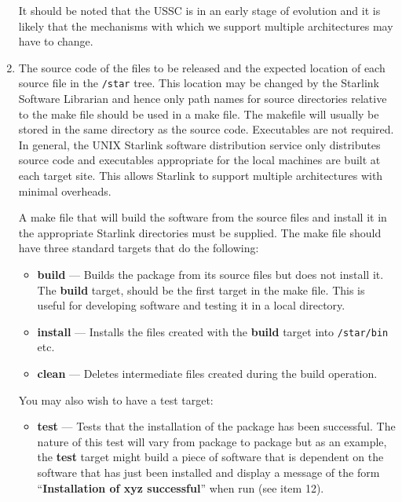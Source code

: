 \begin{enumerate}
It should be noted that the USSC is in an early stage of evolution and it
is likely that the mechanisms with which we support multiple architectures
may have to change.

\item The source code of the files to be released and the expected location
of each source file in the {\tt /star} tree. This location may be changed by
the  Starlink  Software Librarian and hence only path names for source
directories relative to the make file should be used in a make file. The
makefile will usually  be stored in the same directory as the source code.
Executables are not required. In general, the UNIX Starlink software
distribution  service only distributes source code and executables appropriate
for the local machines are built at each target site. This allows Starlink to
support multiple architectures with minimal overheads.

A make file that will build the software from the source files and
install it in the appropriate Starlink directories must be supplied.
The make file should have three standard targets that do the following:

\begin{itemize}

\item {\bf build} --- Builds the package from its source files but does not
install it. The {\bf build} target, should be the first target
in the make file. This is useful for developing software and testing it
in a local directory.

\item {\bf install} --- Installs the files created with the {\bf build}
target into {\tt /star/bin} etc.

\item {\bf clean} --- Deletes intermediate files created during the build
operation.

\end{itemize}

You may also wish to have a test target:

\begin{itemize}


\item {\bf test} --- Tests that the installation of the package has been
successful. The nature of this test will vary from package to package but as
an example, the {\bf test} target might build a piece of software that is
dependent on the software that has just been installed and display a
message of the form ``{\bf Installation of xyz successful}'' when run
(see item 12).


\end{itemize}
\end{enumerate}
